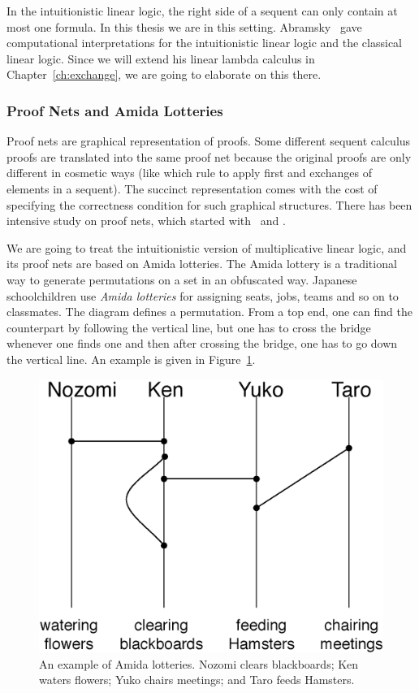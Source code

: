  In the intuitionistic linear logic, the right side of a sequent can only
 contain at most one formula.  In this thesis we are in this
 setting.
 Abramsky~\citep{abramsky1993computational} gave computational
 interpretations for the intuitionistic linear logic and the classical
 linear logic.  Since we will extend his linear lambda calculus in
 Chapter~\ref{ch:exchange}, we are going to elaborate on this there.

 \subsubsection{Proof Nets and Amida Lotteries}
 \label{amidalot}

Proof nets are graphical representation of proofs.
Some different sequent calculus proofs are translated into the same
proof net because the original proofs are only different in cosmetic
ways (like which rule to apply first and exchanges of elements in a
sequent).
The succinct representation comes with the cost of specifying
the correctness condition for such graphical structures.
There has been intensive study on proof nets,
which started with~\citet{girard1987} and \citet{danos-regnier}.

 We are going to treat the intuitionistic version of
 multiplicative linear logic, and its proof nets are based on Amida
 lotteries.
 The Amida lottery is a traditional way to generate permutations on a set%
 in an obfuscated way.
 Japanese schoolchildren use \textit{Amida lotteries}
 for assigning seats, jobs, teams and so on to classmates.
 The diagram defines a permutation.
 From a top end, one can find the counterpart by following the vertical
 line, but one has to cross the bridge whenever one finds one and then
 after crossing the bridge, one has to go down the vertical line.
 An example is given in Figure~\ref{amida-lottery}.

 \begin{figure}[h]
  \centering
  \includegraphics[scale=0.6]{amida.eps}
  \caption[An example of Amida lotteries.]{An example of Amida
  lotteries.  Nozomi clears blackboards; Ken waters flowers; Yuko chairs
  meetings; and Taro feeds Hamsters.}
  \label{amida-lottery}
 \end{figure}


